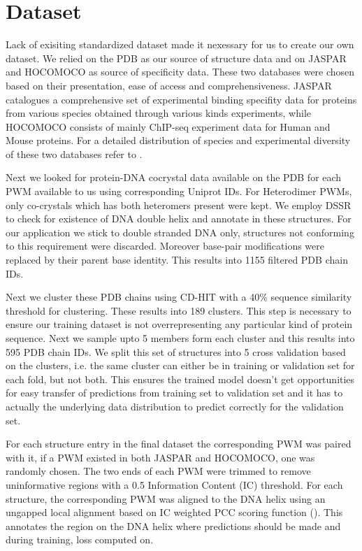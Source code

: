 \section{Dataset}
Lack of exisiting standardized dataset made it nexessary for us to create our own dataset. We relied
on the PDB as our source of structure data and on JASPAR and HOCOMOCO as source
of specificity data. These two databases were chosen based on their presentation, ease of access and
comprehensiveness. JASPAR \citep{fornes2020jaspar} catalogues a comprehensive set of experimental
binding specifity data for proteins from various species obtained through various kinds experiments,
while HOCOMOCO \citep{kulakovskiy2018hocomoco} consists of mainly ChIP-seq experiment data for Human
and Mouse proteins. For a detailed distribution of species and experimental diversity of these two
databases refer to . 
\par
Next we looked for protein-DNA cocrystal data available on the PDB for each PWM available to us
using corresponding Uniprot IDs. For Heterodimer PWMs, only co-crystals which has both heteromers
present were kept. We employ DSSR \citep{lu2015dssr} to check for existence of DNA
double helix and annotate in these structures. For our application we stick to double stranded DNA
only, structures not conforming to this requirement were discarded. Moreover base-pair modifications
were replaced by their parent base identity. This results into 1155 filtered PDB chain IDs.
\par
Next we cluster these PDB chains using CD-HIT \citep{fu2012cd} with a 40\% sequence similarity
threshold for clustering. These results into 189 clusters. This step is necessary to ensure our
training dataset is not overrepresenting any particular kind of protein sequence. Next we sample
upto 5 members form each cluster and this results into 595 PDB chain IDs. We split this set
of structures  into 5 cross validation based on the clusters, i.e. the same cluster can either be in
training or validation set for each fold, but not both. This
ensures the trained model doesn't get opportunities for easy transfer of predictions from training
set to validation set and it has to actually the underlying data distribution to predict correctly
for the validation set.
\par
For each structure entry in the final dataset the corresponding PWM was paired with it, if a PWM
existed in both JASPAR and HOCOMOCO, one was randomly chosen. The two ends of each PWM were trimmed to
remove uninformative regions with a 0.5 Information Content (IC) threshold. For each structure, the
corresponding PWM was aligned to the DNA helix using an ungapped local alignment based on IC
weighted PCC scoring function (). This annotates the region on the DNA helix
where predictions should be made and during training, loss computed on.
